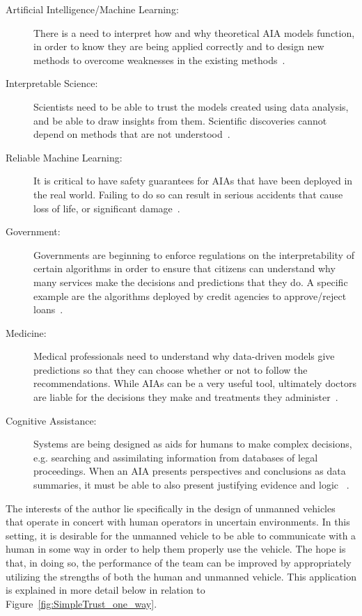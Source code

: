     \begin{description}
        \item [Artificial Intelligence/Machine Learning:] There is a need to interpret how and why theoretical AIA models function, in order to know they are being applied correctly and to design new methods to overcome weaknesses in the existing methods~\cite{Garcia2015-rs,Otte2013-oo}.    
        \item [Interpretable Science:] Scientists need to be able to trust the models created using data analysis, and be able to draw insights from them. Scientific discoveries cannot depend on methods that are not understood~\cite{Kumar2016-yw}.
        \item [Reliable Machine Learning:] It is critical to have safety guarantees for AIAs that have been deployed in the real world. Failing to do so can result in serious accidents that cause loss of life, or significant damage~\cite{Sugiyama2013-ci,Amodei2016-xi}.       
        \item [Government:] Governments are beginning to enforce regulations on the interpretability of certain algorithms in order to ensure that citizens can understand why many services make the decisions and predictions that they do. A specific example are the algorithms deployed by credit agencies to approve/reject loans~\cite{Wagner2016-ck,Turner2016-jq}.
        \item [Medicine:] Medical professionals need to understand why data-driven models give predictions so that they can choose whether or not to follow the recommendations. While AIAs can be a very useful tool, ultimately doctors are liable for the decisions they make and treatments they administer~\cite{Caruana2015-za,Jovanovic2016-gw}.
        \item [Cognitive Assistance:] Systems are being designed as aids for humans to make complex decisions, e.g. searching and assimilating information from databases of legal proceedings. When an AIA presents perspectives and conclusions as data summaries, it must be able to also present justifying evidence and logic ~\cite{Joshi2016-og,Gutfreund2016-xe}.
    \end{description}

    The interests of the author lie specifically in the design of unmanned vehicles that operate in concert with human operators in uncertain environments. In this setting, it is desirable for the unmanned vehicle to be able to communicate with a human in some way in order to help them properly use the vehicle. The hope is that, in doing so, the performance of the team can be improved by appropriately utilizing the strengths of both the human and unmanned vehicle. This application is explained in more detail below in relation to Figure~\ref{fig:SimpleTrust_one_way}.

